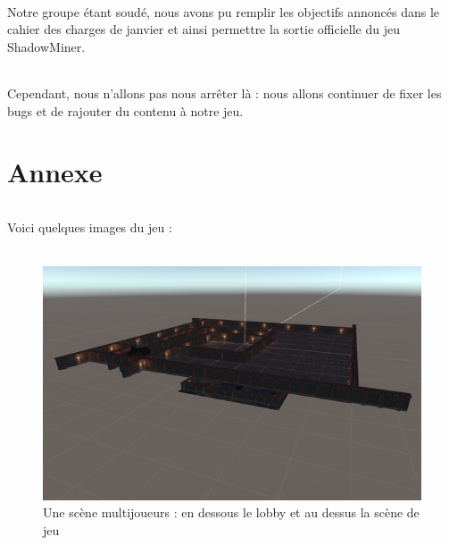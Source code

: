 \documentclass[titlepage, 13px, a4paper]{report}
\begin{document}
\paragraph*{} \hspace{0pt}
Notre groupe étant soudé, nous avons pu remplir les objectifs annoncés dans le cahier des 
charges de janvier et ainsi permettre la sortie officielle du jeu ShadowMiner. \\

\paragraph*{} \hspace{0pt}
Cependant, nous n’allons pas nous arrêter là : nous allons continuer de fixer les bugs 
et de rajouter du contenu à notre jeu. \\



\newpage

\newpage


\part{Annexe}
\paragraph*{} \hspace{0pt}
Voici quelques images du jeu : \\ \\

\begin{figure}[h!]
  \centering
  \includegraphics[width=13cm]{images/annexe_scenemulti.png}
  \caption{Une scène multijoueurs : en dessous le lobby et au dessus la scène de jeu}
\end{figure}
\end{document}
